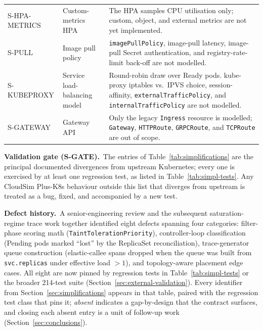 \documentclass[ASNA,twocolumn]{USG}
\newcommand{\ckm}{CloudSim Plus-K8s\xspace}
\begin{document}
\begin{table}[!t]
\begin{tabular*}{\textwidth}{@{\extracolsep{\fill}}@{}l p{} p{}@{}}
\addlinespace
S-HPA-METRICS   & Custom-metrics HPA            & The HPA samples CPU utilisation only; custom, object, and external metrics are not yet implemented. \\
\addlinespace
S-PULL          & Image pull policy             & \texttt{imagePullPolicy}, image-pull latency, image-pull Secret authentication, and registry-rate-limit back-off are not modelled. \\
\addlinespace
S-KUBEPROXY     & Service load-balancing model  & Round-robin draw over Ready pods. kube-proxy iptables vs.\ IPVS choice, session-affinity, \texttt{externalTrafficPolicy}, and \texttt{internalTrafficPolicy} are not modelled. \\
\addlinespace
S-GATEWAY       & Gateway API                   & Only the legacy \texttt{Ingress} resource is modelled; \texttt{Gateway}, \texttt{HTTPRoute}, \texttt{GRPCRoute}, and \texttt{TCPRoute} are out of scope. \\
\bottomrule
        \end{tabular*}
    \end{table}

    \noindent\textbf{Validation gate (S-GATE).}~The entries of
    Table~\ref{tab:simplifications} are the principal documented
    divergences from upstream Kubernetes; every one is exercised by at
    least one regression test, as listed in Table~\ref{tab:simpl-tests}.
    Any \ckm behaviour outside this list that diverges from upstream is
    treated as a bug, fixed, and accompanied by a new test.

    \noindent\textbf{Defect history.}~A senior-engineering review and
    the subsequent saturation-regime trace work together identified
    eight defects spanning four categories: filter-phase scoring math
    (\texttt{TaintTolerationPriority}), controller-loop classification
    (Pending pods marked ``lost'' by the ReplicaSet reconciliation),
    trace-generator queue construction (elastic-callee spans dropped
    when the queue was built from \texttt{svc.replicas} under
    effective load $>1$), and topology-aware placement edge cases.
    All eight are now pinned by regression tests in
    Table~\ref{tab:simpl-tests} or the broader 214-test suite
    (Section~\ref{sec:external-validation}). Every identifier from
    Section~\ref{sec:simplifications} appears in that table, paired with
    the regression test class that pins it; \emph{absent} indicates a
    gap-by-design that the contract surfaces, and closing each absent
    entry is a unit of follow-up work (Section~\ref{sec:conclusions}).
\end{document}

